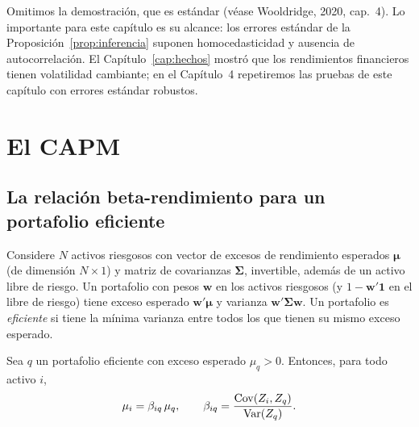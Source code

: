 Omitimos la demostración, que es estándar (véase Wooldridge, 2020, cap.~4). Lo importante para este
capítulo es su alcance: los errores estándar de la Proposición~\ref{prop:inferencia} suponen
homocedasticidad y ausencia de autocorrelación. El Capítulo~\ref{cap:hechos} mostró que los rendimientos
financieros tienen volatilidad cambiante; en el Capítulo~4 repetiremos las pruebas de este capítulo con
errores estándar robustos.

\section{El CAPM}

\subsection{La relación beta-rendimiento para un portafolio eficiente}

Considere $N$ activos riesgosos con vector de excesos de rendimiento esperados $\bm\mu$ (de dimensión
$N\times1$) y matriz de covarianzas $\bm\Sigma$, invertible, además de un activo libre de riesgo. Un
portafolio con pesos $\bm w$ en los activos riesgosos (y $1-\bm w'\bm1$ en el libre de riesgo) tiene
exceso esperado $\bm w'\bm\mu$ y varianza $\bm w'\bm\Sigma\bm w$. Un portafolio es \emph{eficiente} si
tiene la mínima varianza entre todos los que tienen su mismo exceso esperado.

\begin{teorema}\label{teo:betarend}
Sea $q$ un portafolio eficiente con exceso esperado $\mu_q>0$. Entonces, para todo activo $i$,
\[
  \mu_i=\beta_{iq}\,\mu_q,\qquad \beta_{iq}=\frac{\operatorname{Cov}(Z_i,Z_q)}{\operatorname{Var}(Z_q)} .
\]
\end{teorema}

